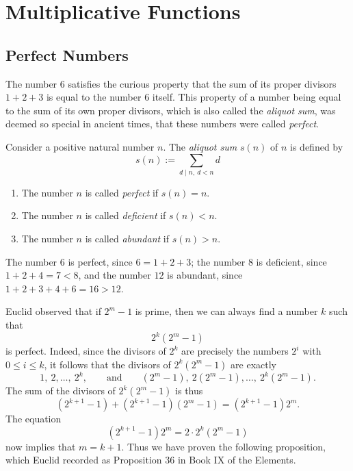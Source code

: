 \chapter{Multiplicative Functions}

\section{Perfect Numbers}

The number $6$ satisfies the curious property that the sum of its proper divisors $1+2+3$ is equal to the number $6$ itself. This property of a number being equal to the sum of its own proper divisors, which is also called the \emph{aliquot sum}, was deemed so special in ancient times, that these numbers were called \emph{perfect}.

\begin{definition}
  Consider a positive natural number $n$. The \emph{aliquot sum} $s(n)$ of $n$ is defined by
  \begin{equation*}
    s(n):=\sum_{d\mid n,~d<n}d
  \end{equation*}
  \begin{enumerate}
  \item The number $n$ is called \emph{perfect} if $s(n)=n$.
  \item The number $n$ is called \emph{deficient} if $s(n)<n$.
  \item The number $n$ is called \emph{abundant} if $s(n)>n$.
  \end{enumerate}
\end{definition}

\begin{example}
  The number $6$ is perfect, since $6=1+2+3$; the number $8$ is deficient, since $1+2+4=7<8$, and the number $12$ is abundant, since $1+2+3+4+6=16>12$.
\end{example}

Euclid observed that if $2^m-1$ is prime, then we can always find a number $k$ such that
\begin{equation*}
  2^k(2^m-1)
\end{equation*}
is perfect. Indeed, since the divisors of $2^k$ are precisely the numbers $2^i$ with $0\leq i\leq k$, it follows that the divisors of $2^k(2^m-1)$ are exactly
\begin{equation*}
  1,~2,\ldots,~2^k,\qquad\text{and}\qquad (2^m-1),~2(2^m-1),\ldots,~2^k(2^m-1).
\end{equation*}
The sum of the divisors of $2^k(2^m-1)$ is thus
\begin{equation*}
  (2^{k+1}-1)+(2^{k+1}-1)(2^m-1)=(2^{k+1}-1)2^m.
\end{equation*}
The equation
\begin{equation*}
  (2^{k+1}-1)2^m=2\cdot 2^k(2^m-1)
\end{equation*}
now implies that $m=k+1$. Thus we have proven the following proposition, which Euclid recorded as Proposition 36 in Book IX of the Elements.

